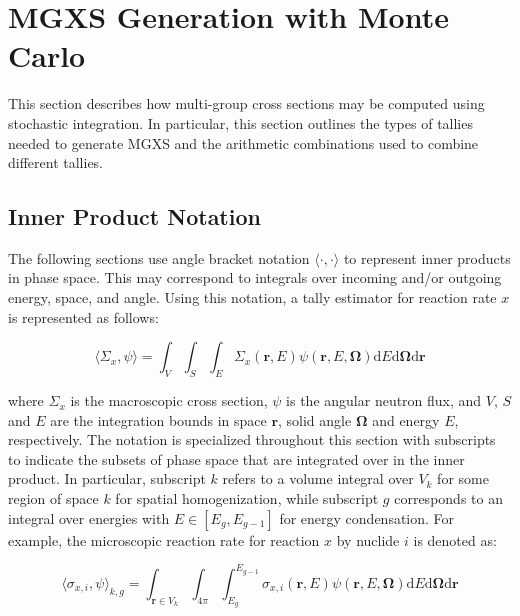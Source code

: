 \section{MGXS Generation with Monte Carlo}
\label{sec:mgxs-mc}

This section describes how multi-group cross sections may be computed using stochastic integration. In particular, this section outlines the types of tallies needed to generate MGXS and the arithmetic combinations used to combine different tallies.

\subsection{Inner Product Notation}
\label{subsubsec:tally-types-notation}

The following sections use angle bracket notation $\langle \cdot , \cdot \rangle$ to represent inner products in phase space. This may correspond to integrals over incoming and/or outgoing energy, space, and angle. Using this notation, a tally estimator for reaction rate $x$ is represented as follows:

\begin{equation}
\label{eqn:inner-prod}
\langle \Sigma_x, \psi \rangle = \int_{V} \int_{S} \int_{E} \Sigma_{x}(\mathbf{r},E)\psi(\mathbf{r},E,\mathbf{\Omega}) \mathrm{d}E\mathrm{d}\mathbf{\Omega}\mathrm{d}\mathbf{r}
\end{equation}

\noindent where $\Sigma_x$ is the macroscopic cross section, $\psi$ is the angular neutron flux, and $V$, $S$ and $E$ are the integration bounds in space $\mathbf{r}$, solid angle $\mathbf{\Omega}$ and energy $E$, respectively. The notation is specialized throughout this section with subscripts to indicate the subsets of phase space that are integrated over in the inner product. In particular, subscript $k$ refers to a volume integral over $V_{k}$ for some region of space $k$ for spatial homogenization, while subscript $g$ corresponds to an integral over energies with $E \in [E_{g}, E_{g-1}]$ for energy condensation. For example, the microscopic reaction rate for reaction $x$ by nuclide $i$ is denoted as:

\begin{equation}
\label{eqn:angle-rxn-rate}
\langle \sigma_{x,i}, \psi \rangle_{k,g} = \int_{\mathbf{r} \in V_{k}} \int_{4\pi} \int_{E_{g}}^{E_{g-1}} \sigma_{x,i}(\mathbf{r},E)\psi(\mathbf{r},E,\mathbf{\Omega}) \mathrm{d}E\mathrm{d}\mathbf{\Omega}\mathrm{d}\mathbf{r}
\end{equation}

